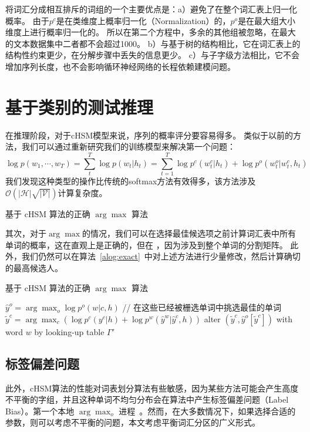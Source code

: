将词汇分成相互排斥的词组的一个主要优点是：a）避免了在整个词汇表上归一化概率。 由于$ p ^ c $是在类维度上概率归一化（Normalization）的，$ p ^ o $是在最大组大小维度上进行概率归一化的。 所以在第二个方程中，多余的其他组被忽略，在最大的文本数据集中二者都不会超过1000。 b）与基于树的结构相比，它在词汇表上的结构性约束更少，在分解步骤中丢失的信息更少。 c）与子字级方法相比，它不会增加序列长度，也不会影响循环神经网络的长程依赖建模问题。



\section{基于类别的测试推理}
在推理阶段，对于cHSM模型来说，序列的概率评分要容易得多。
类似于以前的方法，我们可以通过重新研究我们的训练模型来解决第一个问题：
\begin{equation}\label{equ:class_inf}
   \log p(w_1,\cdots, w_T)=\sum_t^T\log p(w_t|h_t)=\sum_{t=1}^{T}\log p^c(w^c_t|h_t) +\log p^o(w^o_t|w^c_t,h_t)
\end{equation}
我们发现这种类型的操作比传统的softmax方法有效得多，该方法涉及$ \mathcal{O(|H|\sqrt{|V|})}$计算复杂度。

\begin{algorithm}[!ht]
\caption{基于 cHSM 算法的正确 $\arg\max$ 算法}\label{alog:alls}
\end{algorithm}

其次，对于$\arg\max $的情况，我们可以在选择最佳候选项之前计算词汇表中所有单词的概率，这在直观上是正确的，但在
，因为涉及到整个单词的分割矩阵。 此外，我们仍然可以在算法~\ref{alog:exact}~中对上述方法进行少量修改，然后计算确切的最高候选人。
\begin{algorithm}[!ht]
\caption{基于 cHSM 算法的正确 $\arg\max$ 算法}\label{alog:exact}
 {$\hat y^o=\arg\max_o{\log p^o(w| c,h)}$ }
 {// 在这些已经被栅选单词中挑选最佳的单词}
 {$\tilde y^c=\arg\max_c{(\log p^c(y^c|h)+\log p^w(\hat y^w|\hat y^c,h))}$}\;
 alter $(\tilde y^c,\hat y^o[\tilde y^c])$ with word $w$ by looking-up table $\Gamma'$ \;
\end{algorithm}

\subsection{标签偏差问题}
此外，cHSM算法的性能对词表划分算法有些敏感，因为某些方法可能会产生高度不平衡的字组，并且这种单词不均匀分布会在算法中产生标签偏差问题（Label Bias）。第一个本地 $\arg\max_o$ 进程~。然而，在大多数情况下，如果选择合适的参数，则可以考虑不平衡的问题，本文考虑平衡词汇分区的广义形式。

